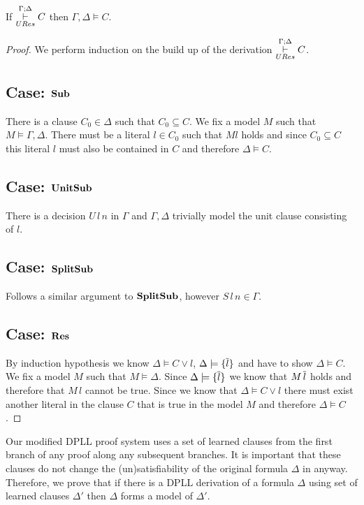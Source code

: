 \medskip
\begin{mytheorem}\label{thm:UResSoundness} \hspace*{0pt} \\
\begin{center}
If  $ \overset{\Gamma;\Delta}{\underset{URes}{\vdash}} C$ then $\Gamma, \Delta \models C$.
\end{center}
%
\begin{proof}
We perform induction on the build up of  the derivation $ \overset{\Gamma;\Delta}{\underset{URes}{\vdash}} C$.
\subsection*{Case: $\mathbf{Sub}$}
%
There is a clause $C_0 \in \Delta$ such that $C_0 \subseteq C$. We fix a model $M$ such that $M \models \Gamma, \Delta $. There must be a literal $l \in C_0$ such that $M l$ holds and since $C_0 \subseteq C$ this literal $l$ must also be contained in $C$ and therefore $\Delta \models C$.
%
\subsection*{Case: $\mathbf{UnitSub}$}
There is a decision $U \, l \, n$ in $\Gamma$ and $\Gamma,\Delta$ trivially model the unit clause consisting of $l$. 
%
\subsection*{Case: $\mathbf{SplitSub}$}
Follows a similar argument to $\mathbf{SplitSub}$, however $S \, l \, n \in \Gamma$.
\subsection*{Case: $\mathbf{Res}$}
By induction hypothesis we know $ \Delta \models C \vee l$, $ \Delta \models \{ \overline{l} \}$ and have to show $ \Delta \models C$. We fix a model $M$ such that $M \models \Delta$.  Since $ \Delta \models \{ \overline{l} \}$ we know that $M \, \overline{l}$ holds and therefore that $M \, l$ cannot be true. Since we know that $ \Delta \models C \vee l$ there must exist another literal in the clause $C$ that is true in the model $M$ and therefore $\Delta \models C$.
\end{proof}
\end{mytheorem} 
%
Our modified DPLL proof system uses a set of learned clauses from the first branch of any proof along any subsequent branches. It is important that these clauses do not change the (un)satisfiability of the original formula $\Delta$ in anyway. Therefore, we prove that if there is a DPLL derivation of a formula $\Delta$ using set of learned clauses $\Delta'$ then $\Delta$ forms a model of $\Delta'$. \\
